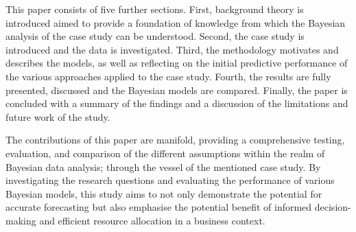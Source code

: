 This paper consists of five further sections. First, background theory is
introduced aimed to provide a foundation of knowledge from which the Bayesian
analysis of the case study can be understood. Second, the case study is
introduced and the data is investigated. Third, the methodology motivates and
describes the models, as well as reflecting on the initial predictive
performance of the various approaches applied to the case study. Fourth, the
results are fully presented, discussed and the Bayesian models are compared.
Finally, the paper is concluded with a summary of the findings and a discussion
of the limitations and future work of the study.


The contributions of this paper are manifold, providing a comprehensive
testing, evaluation, and comparison of the different assumptions within the
realm of Bayesian data analysis; through the vessel of the mentioned case
study. By investigating the research questions and evaluating the performance
of various Bayesian models, this study aims to not only demonstrate the
potential for accurate forecasting but also emphasise the potential benefit of
informed decision-making and efficient resource allocation in a business
context.
